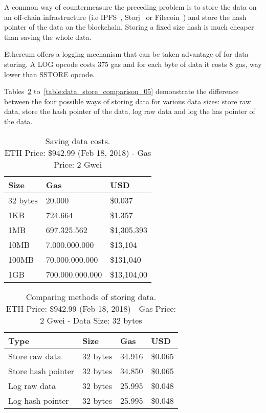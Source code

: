 A common way of countermeasure the preceding problem is to store the data on an off-chain infrastructure (i.e IPFS~\cite{ipfs}, Storj~\cite{storj} or Filecoin~\cite{filecoin}) and store the hash pointer of the data on the blockchain. Storing a fixed size hash is much cheaper than saving the whole data.

Ethereum offers a logging mechanism that can be taken advantage of for data storing. A LOG opcode costs 375 gas and for each byte of data it costs 8 gas, way lower than SSTORE opcode.

Tables~\ref{table:data_store_comparison_01} to~\ref{table:data_store_comparison_05} demonstrate the difference between the four possible ways of storing data for various data sizes: store raw data, store the hash pointer of the data, log raw data and log the has pointer of the data.

\begin{table}[!htb]
\centering
\begin{tabular}{|l|l|l|}
\hline
 Size & Gas  & USD \\ \hline
 32 bytes & 20.000  & \$0.037 \\ \hline
 1KB & 724.664  & \$1.357 \\ \hline
 1MB & 697.325.562  & \$1,305.393 \\ \hline
 10MB & 7.000.000.000  & \$13,104 \\ \hline
 100MB & 70.000.000.000  & \$131,040 \\ \hline
 1GB & 700.000.000.000  & \$13,104,00 \\ \hline
\end{tabular}
\captionsetup{format=hang, justification=centering}
\caption{Saving data costs.\\ ETH Price: \$942.99 (Feb 18, 2018) - Gas Price: 2 Gwei}
\label{table:bytes_usd_cost}
\end{table}

\begin{table}[!htb]
  \centering
  \begin{tabular}{|l|l|l|l|}
  \hline
  Type & Size & Gas  & USD \\ \hline
  Store raw data & 32 bytes & 34.916  & \$0.065 \\ \hline
  Store hash pointer & 32 bytes & 34.850  & \$0.065 \\ \hline
  Log raw data & 32 bytes & 25.995  & \$0.048 \\ \hline
  Log hash pointer & 32 bytes & 25.995  & \$0.048 \\ \hline
  \end{tabular}
  \captionsetup{format=hang, justification=centering}
  \caption{Comparing methods of storing data.\\ ETH Price: \$942.99 (Feb 18, 2018) - Gas Price: 2 Gwei - Data Size: 32 bytes}
  \label{table:data_store_comparison_01}
\end{table}

